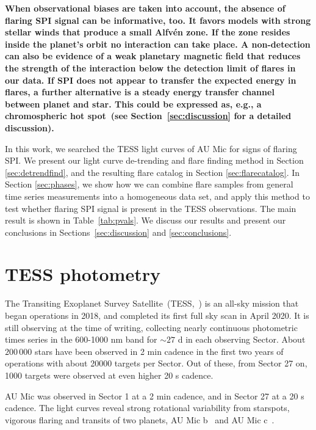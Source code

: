 \documentclass[fleqn,usenatbib]{mnras}%
\begin{document}
\textbf{When observational biases are taken into account, the absence of flaring SPI signal can be informative, too. It favors models with strong stellar winds that produce a small Alfv\'en zone. If the zone resides inside the planet's orbit no interaction can take place. A non-detection can also be evidence of a weak planetary magnetic field that reduces the strength of the interaction below the detection limit of flares in our data. If SPI does not appear to transfer the expected energy in flares, a further alternative is a steady energy transfer channel between planet and star. This could be expressed as, e.g., a chromospheric hot spot~(see Section~\ref{sec:discussion} for a detailed discussion).}  

In this work, we searched the TESS light curves of AU Mic for signs of flaring SPI. We present our light curve de-trending and flare finding method in Section \ref{sec:detrendfind}, and the resulting flare catalog in Section \ref{sec:flarecatalog}. In Section \ref{sec:phases}, we show how we can combine flare samples from general time series measurements into a homogeneous data set, and apply this method to test whether flaring SPI signal is present in the TESS observations. The main result is shown in Table~\ref{tab:pvals}. We discuss our results and present our conclusions in Sections~\ref{sec:discussion} and \ref{sec:conclusions}.

\section{TESS photometry}
The Transiting Exoplanet Survey Satellite~(TESS,~\citealt{ricker2014}) is an all-sky mission that began operations in 2018, and completed its first full sky scan in April 2020. It is still observing at the time of writing, collecting nearly continuous photometric times series in the 600-1000 nm band for $\sim 27$ d in each observing Sector. About $200\,000$ stars have been observed in 2 min cadence in the first two years of operations with about 20000 targets per Sector. Out of these, from Sector 27 on, 1000 targets were observed at even higher 20 s cadence.

AU Mic was observed in Sector 1 at a 2 min cadence, and in Sector 27 at a 20 s cadence. The light curves reveal strong rotational variability from starspots, vigorous flaring and transits of two planets, AU Mic b~\citep{plavchan2020,martioli2021new} and AU Mic c~\citep{plavchan2020,martioli2021new}.
\end{document}
